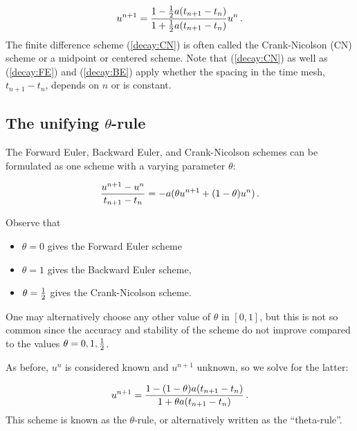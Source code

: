 \documentclass[%
oneside,                 %
final,                   %
10pt]{article}
\begin{document}
\begin{equation}
u^{n+1} = \frac{1-\frac{1}{2} a(t_{n+1}-t_n)}{1 + \frac{1}{2} a(t_{n+1}-t_n)}u^n\thinspace .
\label{decay:CN}
\end{equation}
The finite difference scheme (\ref{decay:CN}) is often called
the Crank-Nicolson (CN) scheme or a midpoint or centered scheme.
Note that (\ref{decay:CN}) as well as (\ref{decay:FE}) and (\ref{decay:BE})
apply whether the spacing in the time mesh, $t_{n+1}-t_n$, depends on $n$
or is constant.


\subsection{The unifying $\theta$-rule}
\label{decay:schemes:theta}

  

The Forward Euler, Backward Euler, and Crank-Nicolson schemes can be
formulated as one scheme with a varying parameter $\theta$:

\begin{equation}
\frac{u^{n+1}-u^{n}}{t_{n+1}-t_n} = -a (\theta u^{n+1} + (1-\theta) u^{n})
\label{decay:th0}
\thinspace .
\end{equation}

Observe that

\begin{itemize}
 \item $\theta =0$ gives the Forward Euler scheme

 \item $\theta =1$ gives the Backward Euler scheme,

 \item $\theta =\frac{1}{2}$ gives the Crank-Nicolson scheme.
\end{itemize}

\noindent
One may alternatively choose any other value of $\theta$ in $[0,1]$, but
this is not so common since the accuracy and stability of
the scheme do not improve compared
to the values $\theta=0,1,\frac{1}{2}$.

As before, $u^n$ is considered known and $u^{n+1}$ unknown, so
we solve for the latter:

\begin{equation}
u^{n+1} = \frac{1 - (1-\theta) a(t_{n+1}-t_n)}{1 + \theta a(t_{n+1}-t_n)}\thinspace .
\label{decay:th}
\end{equation}
This scheme is known as the $\theta$-rule, or alternatively written as
the ``theta-rule''.
\end{document}

